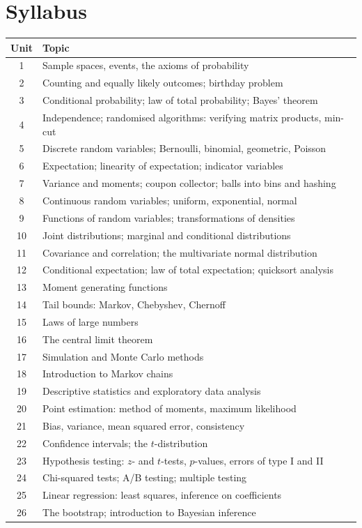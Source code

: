\documentclass[11pt,a4paper]{article}
\begin{document}
\section{Syllabus}
\begin{tabularx}{\textwidth}{c X}
\toprule
\textbf{Unit} & \textbf{Topic} \\
\midrule
1  & Sample spaces, events, the axioms of probability \\
2  & Counting and equally likely outcomes; birthday problem \\
3  & Conditional probability; law of total probability; Bayes' theorem \\
4  & Independence; randomised algorithms: verifying matrix products, min-cut \\
5  & Discrete random variables; Bernoulli, binomial, geometric, Poisson \\
6  & Expectation; linearity of expectation; indicator variables \\
7  & Variance and moments; coupon collector; balls into bins and hashing \\
8  & Continuous random variables; uniform, exponential, normal \\
9  & Functions of random variables; transformations of densities \\
10 & Joint distributions; marginal and conditional distributions \\
11 & Covariance and correlation; the multivariate normal distribution \\
12 & Conditional expectation; law of total expectation; quicksort analysis \\
13 & Moment generating functions \\
14 & Tail bounds: Markov, Chebyshev, Chernoff \\
15 & Laws of large numbers \\
16 & The central limit theorem \\
17 & Simulation and Monte Carlo methods \\
18 & Introduction to Markov chains \\
19 & Descriptive statistics and exploratory data analysis \\
20 & Point estimation: method of moments, maximum likelihood \\
21 & Bias, variance, mean squared error, consistency \\
22 & Confidence intervals; the $t$-distribution \\
23 & Hypothesis testing: $z$- and $t$-tests, $p$-values, errors of type I and II \\
24 & Chi-squared tests; A/B testing; multiple testing \\
25 & Linear regression: least squares, inference on coefficients \\
26 & The bootstrap; introduction to Bayesian inference \\
\bottomrule
\end{tabularx}
\end{document}
